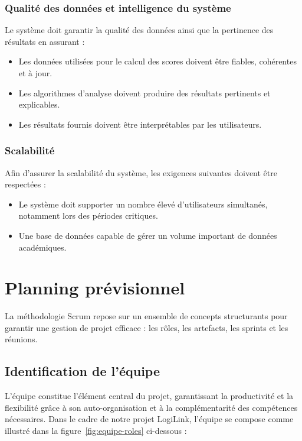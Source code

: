 \subsubsection{Qualité des données et intelligence du système}
Le système doit garantir la qualité des données ainsi que la pertinence des résultats en assurant :

\begin{itemize}
  \item Les données utilisées pour le calcul des scores doivent être fiables, cohérentes et à jour.
  \item Les algorithmes d'analyse doivent produire des résultats pertinents et explicables.
  \item Les résultats fournis doivent être interprétables par les utilisateurs.
\end{itemize}

\subsubsection{Scalabilité }
Afin d’assurer la scalabilité du système, les exigences suivantes doivent être respectées : 
\begin{itemize}
  \item Le système doit supporter un nombre élevé d’utilisateurs simultanés, notamment lors des périodes critiques.
  \item Une base de données capable de gérer un volume important de données académiques.
\end{itemize}

\section{Planning prévisionnel}


La méthodologie Scrum repose sur un ensemble de concepts structurants pour garantir une gestion de projet efficace : les rôles, les artefacts, les sprints et les réunions.


\subsection{Identification de l'équipe}

L’équipe constitue l’élément central du projet, garantissant la productivité et la flexibilité grâce à son auto-organisation et à la complémentarité des compétences nécessaires. Dans le cadre de notre projet LogiLink, l’équipe se compose comme illustré dans la figure~\ref{fig:equipe-roles}  ci-dessous :


